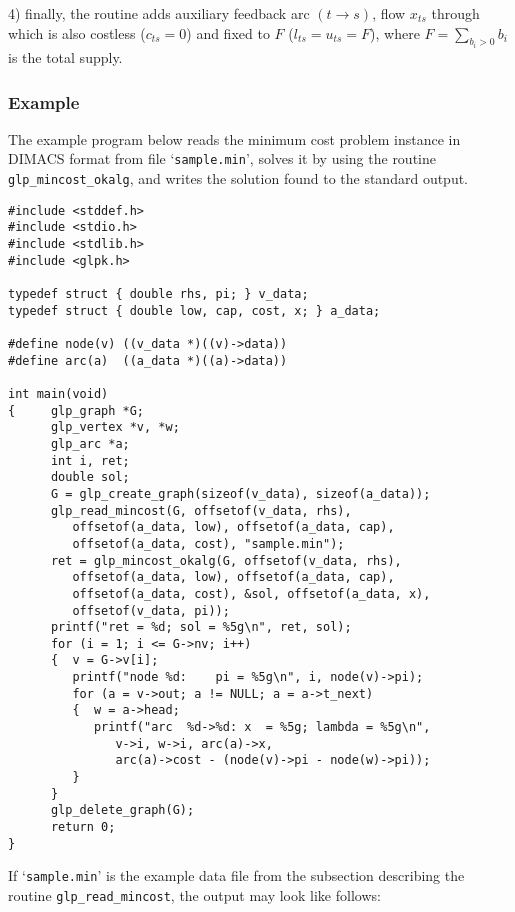 4) finally, the routine adds auxiliary feedback arc $(t\rightarrow s)$,
flow $x_{ts}$ through which is also costless ($c_{ts}=0$) and fixed to
$F$ ($l_{ts}=u_{ts}=F$), where $\displaystyle F=\sum_{b_i>0}b_i$ is the
total supply.

\subsubsection*{Example}

The example program below reads the minimum cost problem instance in
DIMACS format from file `\verb|sample.min|', solves it by using the
routine \verb|glp_mincost_okalg|, and writes the solution found to the
standard output.

\newpage

\begin{verbatim}
#include <stddef.h>
#include <stdio.h>
#include <stdlib.h>
#include <glpk.h>

typedef struct { double rhs, pi; } v_data;
typedef struct { double low, cap, cost, x; } a_data;

#define node(v) ((v_data *)((v)->data))
#define arc(a)  ((a_data *)((a)->data))

int main(void)
{     glp_graph *G;
      glp_vertex *v, *w;
      glp_arc *a;
      int i, ret;
      double sol;
      G = glp_create_graph(sizeof(v_data), sizeof(a_data));
      glp_read_mincost(G, offsetof(v_data, rhs),
         offsetof(a_data, low), offsetof(a_data, cap),
         offsetof(a_data, cost), "sample.min");
      ret = glp_mincost_okalg(G, offsetof(v_data, rhs),
         offsetof(a_data, low), offsetof(a_data, cap),
         offsetof(a_data, cost), &sol, offsetof(a_data, x),
         offsetof(v_data, pi));
      printf("ret = %d; sol = %5g\n", ret, sol);
      for (i = 1; i <= G->nv; i++)
      {  v = G->v[i];
         printf("node %d:    pi = %5g\n", i, node(v)->pi);
         for (a = v->out; a != NULL; a = a->t_next)
         {  w = a->head;
            printf("arc  %d->%d: x  = %5g; lambda = %5g\n",
               v->i, w->i, arc(a)->x,
               arc(a)->cost - (node(v)->pi - node(w)->pi));
         }
      }
      glp_delete_graph(G);
      return 0;
}
\end{verbatim}

\newpage

If `\verb|sample.min|' is the example data file from the subsection
describing the routine \verb|glp_read_mincost|, the output may look like
follows:


